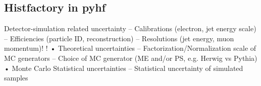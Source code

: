 \subsection{Histfactory in pyhf}



Detector-simulation related uncertainty
– Calibrations (electron, jet energy scale)
– Efficiencies (particle ID, reconstruction)
– Resolutions (jet energy, muon momentum)!
!
• Theoretical uncertainties
– Factorization/Normalization scale of MC generators
– Choice of MC generator (ME and/or PS, e.g. Herwig vs Pythia)
• Monte Carlo Statistical uncertainties
– Statistical uncertainty of simulated samples

